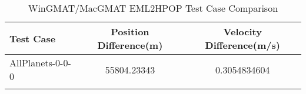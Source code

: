 \begin{table}[htbp!]
\centering
\caption{ WinGMAT/MacGMAT EML2HPOP Test Case Comparison}
      \begin{tabular}{lcc}
      \hline\hline
          Test Case & Position Difference(m) & Velocity Difference(m/s) \\
         \hline
         AllPlanets-0-0-0 & 55804.23343 & 0.3054834604 \\
      \hline\hline
      \label{Table: EML2HPOP WinGMAT-MacGMAT Table} 
\end{tabular}
\end{table}
